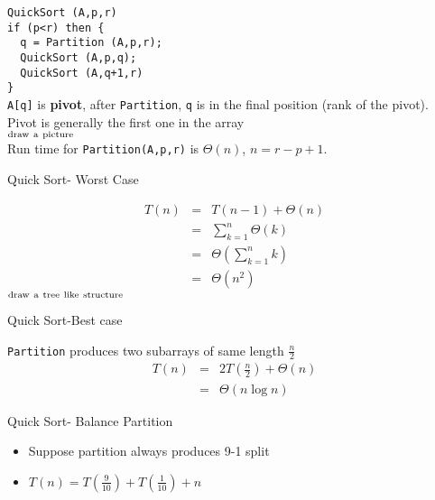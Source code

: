 \documentclass{beamer}
\begin{document}
\begin{frame}{}
\begin{center}
\end{center}
{\tt QuickSort (A,p,r)}\\
{\tt if (p<r) then \{ \\
\ \ q = Partition (A,p,r);\\
\ \ QuickSort (A,p,q); \\
\ \ QuickSort (A,q+1,r)\\
\}\\}
{\tt A[q]} is {\bf pivot}, after {\tt Partition}, {\tt q} is in the final
 position (rank of the pivot).  Pivot is generally the first one in the 
array\\ 
$_{\rm draw\ a\ picture}$\\
Run time for {\tt Partition(A,p,r)} is $\Theta(n)$, $n=r-p+1$.
\end{frame}


\begin{frame}{}
\begin{center}
Quick Sort- Worst Case
\end{center}
\begin{eqnarray*}
T(n) &=& T(n-1)+\Theta(n) \\
&=& \sum^n_{k=1}\Theta(k) \\
&=& \Theta (\sum^n_{k=1}k) \\
&=& \Theta (n^2)
\end{eqnarray*}
$_{\rm draw\ a\ tree\ like\ structure}$
\end{frame}

\begin{frame}{}
\begin{center}
Quick Sort-Best case
\end{center}
{\tt Partition} produces two subarrays of same length $\frac{n}{2}$
\begin{eqnarray*}
T(n) &=& 2T(\frac{n}{2}) + \Theta(n) \\
&=&\Theta(n\log n)
\end{eqnarray*}
\end{frame}

\begin{frame}{}
\begin{center}
Quick Sort- Balance Partition
\end{center}
\begin{itemize}
\item Suppose partition always produces 9-1 split \\
\item $T(n) = T(\frac{9}{10})+T(\frac{1}{10})+n$
\end{itemize}
\end{frame}
\end{document}
